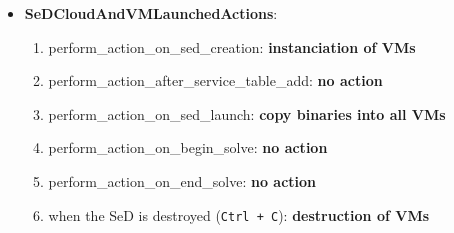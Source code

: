 \begin{itemize}
  \item \textbf{SeDCloudAndVMLaunchedActions}:
    \begin{enumerate}
      \item perform\_action\_on\_sed\_creation: \textbf{instanciation of VMs}
      \item perform\_action\_after\_service\_table\_add: \textbf{no action}
      \item perform\_action\_on\_sed\_launch: \textbf{copy binaries into all VMs}
      \item perform\_action\_on\_begin\_solve: \textbf{no action}
      \item perform\_action\_on\_end\_solve: \textbf{no action}
      \item when the SeD is destroyed (\texttt{Ctrl + C}): \textbf{destruction of VMs}
    \end{enumerate}
 

\end{itemize}

